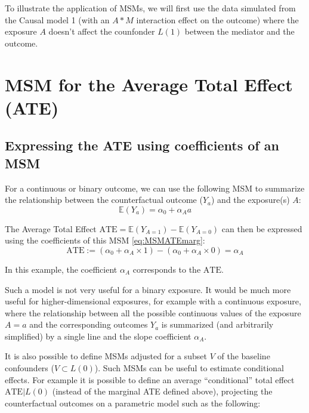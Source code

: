\documentclass[
]{book}
\begin{document}
To illustrate the application of MSMs, we will first use the data simulated from the Causal model 1 (with an \(A \ast M\) interaction effect on the outcome) where the exposure \(A\) doesn't affect the counfonder \(L(1)\) between the mediator and the outcome.

\section{MSM for the Average Total Effect (ATE)}\label{msm_ATE_paragraph}

\subsection{Expressing the ATE using coefficients of an MSM}\label{expressing-the-ate-using-coefficients-of-an-msm}

For a continuous or binary outcome, we can use the following MSM to summarize the relationship between the counterfactual outcome (\(Y_a\)) and the exposure(s) \(A\):
\begin{equation} 
  \mathbb{E}(Y_a) = \alpha_0 + \alpha_A a 
  \label{eq:MSMATEmarg}
\end{equation}

The Average Total Effect \(\text{ATE} = \mathbb{E}(Y_{A=1}) - \mathbb{E}(Y_{A=0})\) can then be expressed using the coefficients of this MSM \eqref{eq:MSMATEmarg}:
\begin{equation*} 
  \text{ATE} := \left(\alpha_0 + \alpha_A \times 1 \right) - \left(\alpha_0 + \alpha_A \times 0 \right) = \alpha_A 
\end{equation*}

In this example, the coefficient \(\alpha_A\) corresponds to the \(\text{ATE}\).

Such a model is not very useful for a binary exposure. It would be much more useful for higher-dimensional exposures, for example with a continuous exposure, where the relationship between all the possible continuous values of the exposure \(A=a\) and the corresponding outcomes \(Y_a\) is summarized (and arbitrarily simplified) by a single line and the slope coefficient \(\alpha_A\).

It is also possible to define MSMs adjusted for a subset \(V\) of the baseline confounders (\(V \subset L(0)\)). Such MSMs can be useful to estimate conditional effects. For example it is possible to define an average ``conditional'' total effect \(\text{ATE}|L(0)\) (instead of the marginal ATE defined above), projecting the counterfactual outcomes on a parametric model such as the following:
\end{document}
